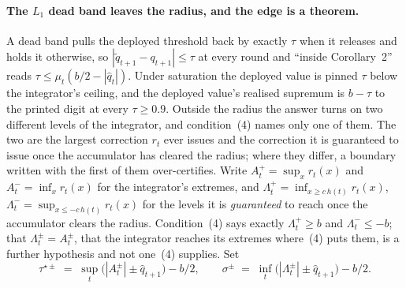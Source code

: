 \paragraph{The $L_1$ dead band leaves the radius, and the edge is a theorem.} A dead band pulls
the deployed threshold back by exactly $\tau$ when it releases and holds it otherwise, so
$|\tilde{q}_{t+1}-q_{t+1}| \le \tau$ at every round and ``inside Corollary~2'' reads
$\tau \le \mu_t(b/2-|\hat{q}_t|)$. Under saturation the deployed value is pinned $\tau$ below the
integrator's ceiling, and the deployed value's realised supremum is $b-\tau$ to the printed
digit at every $\tau \ge 0.9$. Outside the radius the answer turns on two different levels of the
integrator, and condition~(4) names only one of them. The two are the largest correction $r_t$
ever issues and the correction it is guaranteed to issue once the accumulator has cleared the
radius; where they differ, a boundary written with the first of them over-certifies.
Write $A^{+}_t = \sup_x r_t(x)$ and $A^{-}_t = \inf_x r_t(x)$ for the integrator's extremes, and
$\Lambda^{+}_t = \inf_{x \ge c\,h(t)} r_t(x)$, $\Lambda^{-}_t = \sup_{x \le -c\,h(t)} r_t(x)$ for
the levels it is \emph{guaranteed} to reach once the accumulator clears the radius.
Condition~(4) says exactly $\Lambda^{+}_t \ge b$ and $\Lambda^{-}_t \le -b$; that
$\Lambda^{\pm}_t = A^{\pm}_t$, that the integrator reaches its extremes where~(4) puts them, is a
further hypothesis and not one~(4) supplies. Set
\begin{equation}
  \tau^{\star\pm} \;=\; \sup_t\big(|A^{\pm}_t| \pm \hat{q}_{t+1}\big) - b/2,
  \qquad
  \sigma^{\pm} \;=\; \inf_t\big(|\Lambda^{\pm}_t| \pm \hat{q}_{t+1}\big) - b/2 .
  \label{eq:boundaries}
\end{equation}

